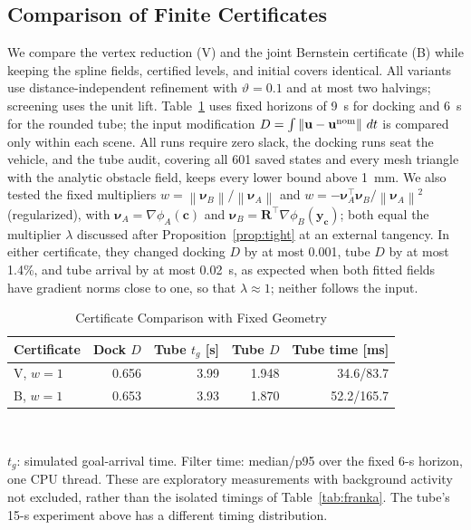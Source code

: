 \documentclass[journal]{IEEEtran}
\theoremstyle{definition}
\newcommand{\norm}[1]{\left\lVert #1\right\rVert}
\newcommand{\Rot}{\mathbf{R}}
\begin{document}
\subsection{Comparison of Finite Certificates}\label{sec:cert-comparison}
We compare the vertex reduction (V) and the joint Bernstein certificate (B) while keeping
the spline fields, certified levels, and initial covers identical. All variants use
distance-independent refinement with $\vartheta=0.1$ and at most two halvings; screening
uses the unit lift. Table~\ref{tab:cert-comparison} uses fixed horizons of 9~s for docking and
6~s for the rounded tube; the input modification $D=\int\norm{\mathbf u-\mathbf u^{\rm nom}}\,dt$ is
compared only within each scene. All runs require zero slack, the docking runs seat the vehicle,
and the tube audit, covering all 601 saved states and every mesh triangle with the analytic
obstacle field, keeps every lower bound above 1~mm. We also tested the fixed multipliers
$w=\norm{\boldsymbol\nu_B}/\norm{\boldsymbol\nu_A}$ and
$w=-\boldsymbol\nu_A^\top\boldsymbol\nu_B/\norm{\boldsymbol\nu_A}^2$ (regularized), with
$\boldsymbol\nu_A=\nabla\phi_A(\mathbf c)$ and $\boldsymbol\nu_B=\Rot^\top\nabla\phi_B(\mathbf y_{\mathbf c})$;
both equal the multiplier $\lambda$ discussed after Proposition~\ref{prop:tight} at an external
tangency. In either certificate, they changed docking $D$ by at most 0.001, tube $D$ by at most
1.4\%, and tube arrival by at most 0.02~s, as expected when both fitted fields have gradient norms
close to one, so that $\lambda\approx1$; neither follows the input.

\begin{table}[t]
\caption{Certificate Comparison with Fixed Geometry}
\label{tab:cert-comparison}
\centering\footnotesize
\setlength{\tabcolsep}{3pt}
\begin{tabular}{lrrrr}
\toprule
Certificate & Dock $D$ & Tube $t_g$ [s] & Tube $D$ & Tube time [ms]\\
\midrule
V, $w=1$       & 0.656 & 3.99 & 1.948 & 34.6/83.7\\
B, $w=1$       & 0.653 & 3.93 & 1.870 & 52.2/165.7\\
\bottomrule
\end{tabular}
\\[3pt]
\parbox{\columnwidth}{\footnotesize $t_g$: simulated goal-arrival time. Filter time: median/p95
over the fixed 6-s horizon, one CPU thread. These are exploratory measurements with background
activity not excluded, rather than the isolated timings of Table~\ref{tab:franka}. The tube's
15-s experiment above has a different timing distribution.}
\end{table}
\end{document}
